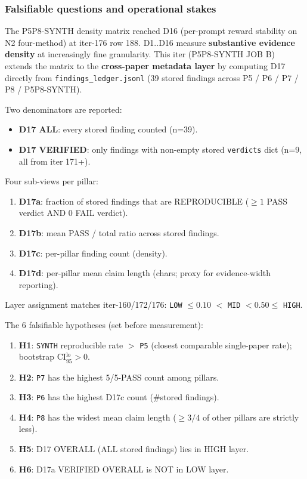 \documentclass{article}
\begin{document}
\subsubsection{Falsifiable questions and operational stakes}\label{sec:synth-iter180-seventeen-domain}
The P5P8-SYNTH density matrix reached D16 (per-prompt reward
stability on N2 four-method) at iter-176 row 188. D1..D16 measure
\textbf{substantive evidence density} at increasingly fine
granularity. This iter (P5P8-SYNTH JOB B) extends the matrix to the
\textbf{cross-paper metadata layer} by computing D17 directly from
\texttt{findings\_ledger.jsonl} (39 stored findings across
P5 / P6 / P7 / P8 / P5P8-SYNTH).

Two denominators are reported:
\begin{itemize}
\item \textbf{D17 ALL}: every stored finding counted (n=39).
\item \textbf{D17 VERIFIED}: only findings with non-empty stored
  \texttt{verdicts} dict (n=9, all from iter 171+).
\end{itemize}

Four sub-views per pillar:
\begin{enumerate}
\item \textbf{D17a}: fraction of stored findings that are
  REPRODUCIBLE ($\ge 1$ PASS verdict AND $0$ FAIL verdict).
\item \textbf{D17b}: mean PASS / total ratio across stored findings.
\item \textbf{D17c}: per-pillar finding count (density).
\item \textbf{D17d}: per-pillar mean claim length (chars; proxy
  for evidence-width reporting).
\end{enumerate}

Layer assignment matches iter-160/172/176: \texttt{LOW} $\le 0.10$
$< $ \texttt{MID} $ < 0.50 \le $ \texttt{HIGH}.

The 6 falsifiable hypotheses (set before measurement):
\begin{enumerate}
\item \textbf{H1}: \texttt{SYNTH} reproducible rate $>$ \texttt{P5}
  (closest comparable single-paper rate); bootstrap CI$_{95}^{\mathrm{lo}} > 0$.
\item \textbf{H2}: \texttt{P7} has the highest 5/5-PASS count
  among pillars.
\item \textbf{H3}: \texttt{P6} has the highest D17c count
  (\#stored findings).
\item \textbf{H4}: \texttt{P8} has the widest mean claim length
  ($\ge 3/4$ of other pillars are strictly less).
\item \textbf{H5}: D17 OVERALL (ALL stored findings) lies in HIGH layer.
\item \textbf{H6}: D17a VERIFIED OVERALL is NOT in LOW layer.
\end{enumerate}
\end{document}
